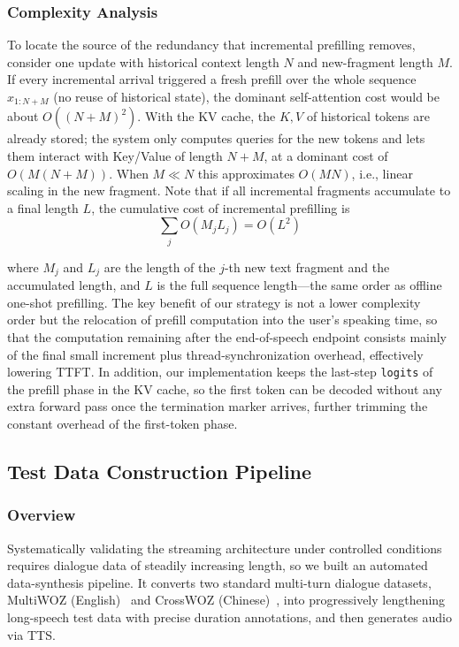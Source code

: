 \documentclass[conference]{IEEEtran}
\begin{document}
\subsubsection{Complexity Analysis}

To locate the source of the redundancy that incremental prefilling removes, consider one update with historical context length $N$ and new-fragment length $M$. If every incremental arrival triggered a fresh prefill over the whole sequence $x_{1:N+M}$ (no reuse of historical state), the dominant self-attention cost would be about $O\!\left((N+M)^{2}\right)$. With the KV cache, the $K,V$ of historical tokens are already stored; the system only computes queries for the new tokens and lets them interact with Key/Value of length $N+M$, at a dominant cost of $O\!\left(M(N+M)\right)$. When $M\ll N$ this approximates $O(MN)$, i.e., linear scaling in the new fragment. Note that if all incremental fragments accumulate to a final length $L$, the cumulative cost of incremental prefilling is
\begin{equation}
\sum_{j}O\!\left(M_j L_j\right)=O\!\left(L^{2}\right)
\label{eq:cumcost}
\end{equation}

where $M_j$ and $L_j$ are the length of the $j$-th new text fragment and the accumulated length, and $L$ is the full sequence length---the same order as offline one-shot prefilling. The key benefit of our strategy is not a lower complexity order but the relocation of prefill computation into the user's speaking time, so that the computation remaining after the end-of-speech endpoint consists mainly of the final small increment plus thread-synchronization overhead, effectively lowering TTFT. In addition, our implementation keeps the last-step \texttt{logits} of the prefill phase in the KV cache, so the first token can be decoded without any extra forward pass once the termination marker arrives, further trimming the constant overhead of the first-token phase.

\subsection{Test Data Construction Pipeline}\label{sec:data}

\subsubsection{Overview}

Systematically validating the streaming architecture under controlled conditions requires dialogue data of steadily increasing length, so we built an automated data-synthesis pipeline. It converts two standard multi-turn dialogue datasets, MultiWOZ (English)~\cite{ref14} and CrossWOZ (Chinese)~\cite{ref15}, into progressively lengthening long-speech test data with precise duration annotations, and then generates audio via TTS.
\end{document}
